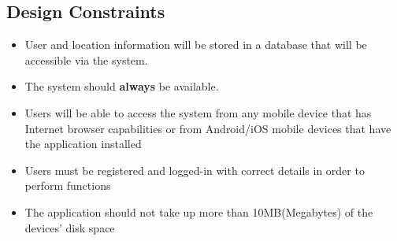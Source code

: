 
\subsection{Design Constraints}
\begin{itemize}
    \item User and location information will be stored in a database that will be accessible via the system.
    \item The system should \textbf{always} be available.
    \item Users will be able to access the system from any mobile device that has Internet browser capabilities or from Android/iOS mobile devices that have the application installed
    \item Users must be registered and logged-in with correct details in order to perform functions
    \item The application should not take up more than 10MB(Megabytes) of the devices' disk space
    
\end{itemize}
